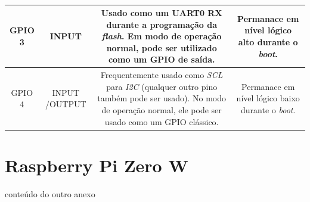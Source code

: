 \begin{anexosenv}
\begin{table}[]
\begin{tabular}{c|c|c|c}
		GPIO 3 & INPUT & \multicolumn{1}{m{6cm}|}{Usado como um UART0 RX durante a programação da \textit{flash}. Em modo de operação normal, pode ser utilizado como um GPIO de saída.} & \multicolumn{1}{m{4cm}}{Permanace em nível lógico alto durante o \textit{boot}.}\\ \hline
		
		GPIO 4 & INPUT /OUTPUT & \multicolumn{1}{m{6cm}|}{Frequentemente usado como \textit{SCL} para \textit{I2C} (qualquer outro pino também pode ser usado). No modo de operação normal, ele pode ser usado como um GPIO clássico.} & \multicolumn{1}{m{4cm}}{Permanace em nível lógico baixo durante o \textit{boot}.}\\ \hline
		
		
		
		
	\end{tabular}
	\caption{}
	\label{tab:ta}
\end{table}



\chapter{Raspberry Pi Zero W}
\label{chap:anexoB}

conteúdo do outro anexo

\end{anexosenv}

